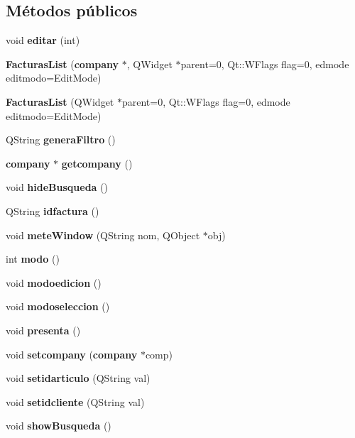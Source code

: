 \subsection*{M\'{e}todos p\'{u}blicos}
\begin{CompactItemize}
\item 
void {\bf editar} (int)\label{classFacturasList_a0}

\item 
{\bf Facturas\-List} ({\bf company} $\ast$, QWidget $\ast$parent=0, Qt::WFlags flag=0, edmode editmodo=Edit\-Mode)\label{classFacturasList_a1}

\item 
{\bf Facturas\-List} (QWidget $\ast$parent=0, Qt::WFlags flag=0, edmode editmodo=Edit\-Mode)\label{classFacturasList_a2}

\item 
QString {\bf genera\-Filtro} ()
\item 
{\bf company} $\ast$ {\bf getcompany} ()\label{classFacturasList_a4}

\item 
void {\bf hide\-Busqueda} ()\label{classFacturasList_a5}

\item 
QString {\bf idfactura} ()\label{classFacturasList_a6}

\item 
void {\bf mete\-Window} (QString nom, QObject $\ast$obj)\label{classFacturasList_a7}

\item 
int {\bf modo} ()\label{classFacturasList_a8}

\item 
void {\bf modoedicion} ()\label{classFacturasList_a9}

\item 
void {\bf modoseleccion} ()\label{classFacturasList_a10}

\item 
void {\bf presenta} ()
\item 
void {\bf setcompany} ({\bf company} $\ast$comp)\label{classFacturasList_a12}

\item 
void {\bf setidarticulo} (QString val)\label{classFacturasList_a13}

\item 
void {\bf setidcliente} (QString val)\label{classFacturasList_a14}

\item 
void {\bf show\-Busqueda} ()\label{classFacturasList_a15}

\end{CompactItemize}


